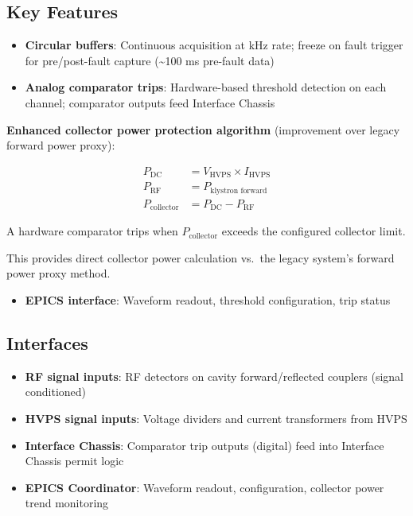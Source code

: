 \subsection{Key Features}\label{key-features}

\begin{itemize}
\tightlist
\item
  \textbf{Circular buffers}: Continuous acquisition at kHz rate; freeze on fault trigger for pre/post-fault capture (\textasciitilde100 ms pre-fault data)
\item
  \textbf{Analog comparator trips}: Hardware-based threshold detection on each channel; comparator outputs feed Interface Chassis
\end{itemize}

\textbf{Enhanced collector power protection algorithm} (improvement over legacy forward power proxy):

\begin{align*}
  P_\text{DC}        &= V_\text{HVPS} \times I_\text{HVPS} \\
  P_\text{RF}        &= P_\text{klystron forward} \\
  P_\text{collector} &= P_\text{DC} - P_\text{RF}
\end{align*}

\noindent A hardware comparator trips when $P_\text{collector}$ exceeds the configured collector limit.

This provides direct collector power calculation vs.~the legacy system's forward power proxy method.

\begin{itemize}
\tightlist
\item
  \textbf{EPICS interface}: Waveform readout, threshold configuration, trip status
\end{itemize}

\subsection{Interfaces}\label{interfaces-1}

\begin{itemize}
\tightlist
\item
  \textbf{RF signal inputs}: RF detectors on cavity forward/reflected couplers (signal conditioned)
\item
  \textbf{HVPS signal inputs}: Voltage dividers and current transformers from HVPS
\item
  \textbf{Interface Chassis}: Comparator trip outputs (digital) feed into Interface Chassis permit logic
\item
  \textbf{EPICS Coordinator}: Waveform readout, configuration, collector power trend monitoring
\end{itemize}

